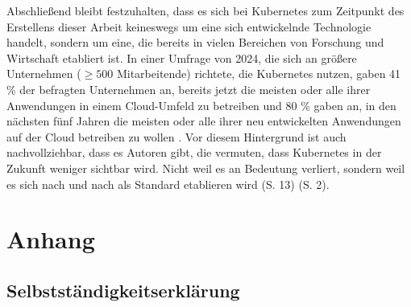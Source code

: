 \documentclass[11pt,a4paper]{article}
\begin{document}
Abschließend bleibt festzuhalten, dass es sich bei Kubernetes zum Zeitpunkt des Erstellens dieser
Arbeit keineswegs um eine sich entwickelnde Technologie handelt, sondern um eine, die bereits
in vielen Bereichen von Forschung und Wirtschaft etabliert ist. In einer Umfrage von 2024, die sich an
größere Unternehmen (\(\ge 500\) Mitarbeitende) richtete, die Kubernetes nutzen, gaben 41 \% der befragten Unternehmen an,
bereits jetzt die meisten oder alle ihrer Anwendungen in einem Cloud-Umfeld zu betreiben und
80 \% gaben an, in den nächsten fünf Jahren die meisten oder alle ihrer neu entwickelten Anwendungen
auf der Cloud betreiben zu wollen \cite{cncf}.
Vor diesem Hintergrund ist auch nachvollziehbar, dass es Autoren gibt, die vermuten,
dass Kubernetes in der Zukunft weniger sichtbar wird. Nicht weil es an Bedeutung verliert,
sondern weil es sich nach und nach als Standard etablieren wird \cite{domingus2022cloud} (S. 13) \cite{Schmeling_Dargatz_2022} (S. 2).






\newpage
\section{Anhang}
\subsection{Selbstständigkeitserklärung}
\end{document}
